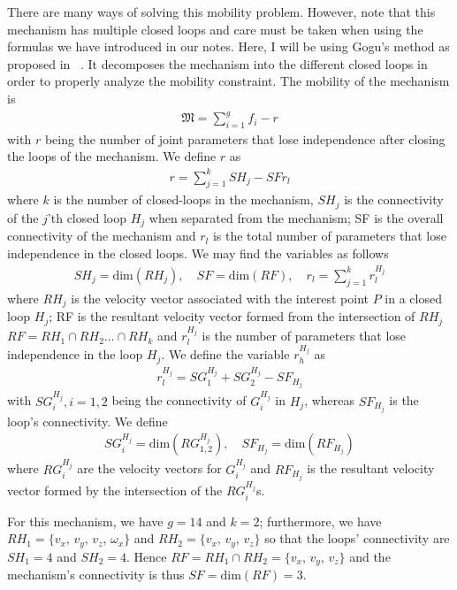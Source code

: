 There are many ways of solving this mobility problem. However, note that this mechanism has multiple closed loops and care must be taken when using the formulas we have introduced in our notes. Here, I will be using Gogu's method as proposed in ~\cite{Gogu}. It decomposes the mechanism into the different closed loops in order to properly analyze the mobility constraint. The mobility of the mechanism is 
%
\begin{align}
	\mathfrak{M} = \sum_{i=1}^{g} f_i - r
\end{align}
%
with $r$ being the number of joint parameters that lose independence after closing the loops of the mechanism. We define $r$ as 
%
\begin{align}
	r = \sum_{j=1}^{k}SH_j - SF  r_l
\end{align}
%
where $k$ is the number of closed-loops in the mechanism, $SH_j$ is the connectivity of the $j$'th closed loop $H_j$ when separated from  the mechanism; SF is the overall connectivity of the mechanism and $r_l$ is the total number of parameters that lose independence in the closed loops. We may find the variables as follows
%
\begin{align}
	SH_j = \text{dim}(RH_j), \quad SF = \text{dim} (RF), \quad r_l = \sum_{j=1}^{k} r_l^{H_j}
\end{align}
%
where $RH_j$ is the velocity vector associated with the interest point $P$ in a closed loop $H_j$; RF is the resultant velocity vector formed from the intersection of $RH_j$ \ie $RF = RH_1 \cap RH_2 \ldots \cap RH_k$ and $r_l^{H_j}$ is the number of parameters that lose independence in the loop $H_j$. We define the variable $r_h^{H_j}$ as 
%
\begin{align}
	r_l^{H_j} = SG_1^{H_j} + SG_2^{H_j} - SF_{H_j} 
\end{align}
%
with $SG_i^{H_j}, i = 1,2$ being the connectivity of $G_i^{H_j}$ in $H_j$, whereas $SF_{H_j}$ is the loop's connectivity. We define
%
\begin{align}
	SG_i^{H_j} = \text{dim} \left(RG_{1,2}^{H_j}\right), \quad SF_{H_j} = \text{dim}\left(RF_{H_j}\right)
\end{align}
%
where $RG_i^{H_j}$ are the velocity vectors for $G_i^{H_j}$ and $RF_{H_j}$ is the resultant velocity vector formed by the intersection of the $RG_i^{H_j}$s.

For this mechanism, we have $g=14$ and $k=2$; furthermore, we have $RH_1 = \{v_x, \, v_y, \, v_z, \, \omega_x\}$ and $RH_2 = \{v_x,\, v_y, \, v_z \}$ so that the loops' connectivity are $SH_1 = 4$ and $SH_2 = 4$. Hence $RF = RH_1 \cap RH_2 = \{v_x, \, v_y, \, v_z\}$ and the mechanism's connectivity is thus $SF = \text{dim} (RF) = 3$.

